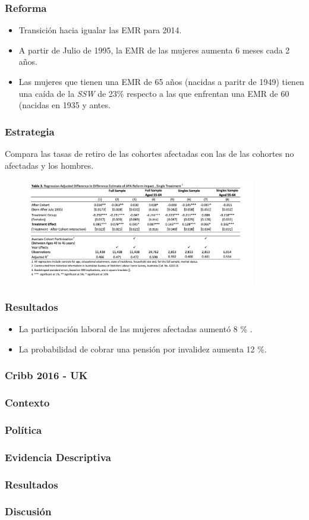 \documentclass{beamer}
\begin{document}
              \frame
              {
                \frametitle{Reforma}
                
                \begin{itemize}
                \item Transición hacia igualar las EMR  para 2014.
                \item A partir de Julio de 1995, la EMR de las mujeres aumenta 6 meses cada 2 años.
                \item Las mujeres que tienen una EMR de 65 años (nacidas a paritr de 1949) tienen una caída de la \textit{SSW} de 23\% respecto a las que enfrentan una EMR de 60 (nacidas en 1935 y antes. 
                \end{itemize}
              }
              \frame
              {
                \frametitle{Estrategia}
                Compara las tasas de retiro de las cohortes afectadas con las de las cohortes no afectadas y los hombres.
              }
              \frame
              {
                  \begin{figure}[htp]
                  \centering
                  \includegraphics[width=10cm]{imgs/atalay-tab3}
                  \label{fig:fig2}
                  \end{figure}
    
              }
              \frame
              {
                \frametitle{Resultados}
                \begin{itemize}
                \item La participación laboral de las mujeres afectadas aumentó  8 \% .
                \item La probabilidad de cobrar una pensión por invalidez aumenta 12 \%.
                \end{itemize}
              }
              \frame
              {
              
              \frametitle{Cribb 2016 - UK}
              }
              \frame
              {
              
                \frametitle{Contexto}
              }
              \frame
              {
              
                \frametitle{Política}
              }
              \frame
              {
              
                \frametitle{Evidencia Descriptiva}
              }
                            \frame
              {
              
                \frametitle{Resultados}
              }
              \frame
              {
                \frametitle{Discusión}
              }
              
\end{document}
